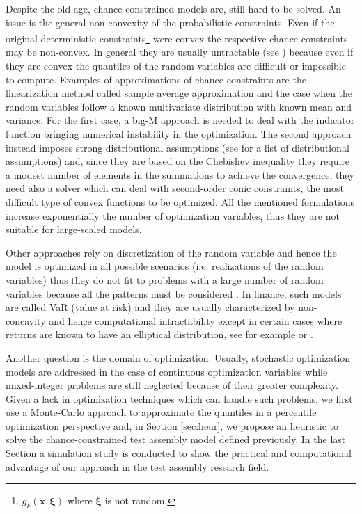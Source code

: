 Despite the old age, chance-constrained models are, still hard to be solved. An issue is the general non-convexity of the probabilistic constraints. Even if the original deterministic constraints\footnote{$g_k(\mathbf{x},\boldsymbol{\xi})$ where $\boldsymbol{\xi}$ is not random.} were convex the respective chance-constraints may be non-convex. In general they are usually untractable (see \textcite{Nemirovski}) because even if they are convex the quantiles of the random variables are difficult or impossible to compute. Examples of approximations of chance-constraints are the linearization method called sample average approximation \parencite{Ahmed2008} and the case when the random variables follow a known multivariate distribution with known mean and variance. For the first case, a big-M approach is needed to deal with the indicator function bringing numerical instability in the optimization. The second approach instead imposes strong distributional assumptions (see \textcite{Kataria} for a list of distributional assumptions) and, since they are based on the Chebishev inequality they require a modest number of elements in the summations to achieve the convergence, they need also a solver which can deal with second-order conic constraints, the most difficult type of convex functions to be optimized. All the mentioned formulations increase exponentially the number of optimization variables, thus they are not suitable for large-scaled models.

Other approaches rely on discretization of the random variable and hence the model is optimized in all possible scenarios (i.e. realizations of the random variables) thus they do not fit to problems with a large number of random variables because all the patterns must be considered \parencite{margellos2014road,wang2011chance,tarim2006}. In finance, such models are called VaR (value at risk) and they are usually characterized by non-concavity and hence computational intractability except in certain cases where returns are known to have an elliptical distribution, see for example \textcite{vehvi2003} or \textcite{mcneil2005}. 

Another question is the domain of optimization. Usually, stochastic optimization models are addressed in the case of continuous optimization variables while mixed-integer problems are still neglected because of their greater complexity. Given a lack in optimization techniques which can handle such problems, we first use a Monte-Carlo approach to approximate the quantiles in a percentile optimization perspective and, in Section \ref{sec:heur}, we propose an heuristic to solve the chance-constrained test assembly model defined previously. In the last Section a simulation study is conducted to show the practical and computational advantage of our approach in the test assembly research field.

